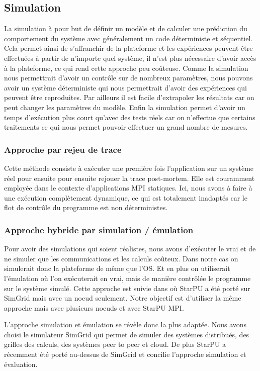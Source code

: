 \documentclass[smallextended]{svjour3}
\begin{document}
\subsection{Simulation}
\label{sec-2-2}
La simulation à pour but de définir un modèle et de calculer une
prédiction du comportement du système avec généralement un code
déterministe et séquentiel. Cela permet ainsi de s'affranchir de la
plateforme et les expériences peuvent être effectuées à partir de
n'importe quel système, il n'est plus nécessaire d'avoir accès à la
plateforme, ce qui rend cette approche peu coûteuse. Comme la 
simulation nous permettrait d'avoir un contrôle sur de nombreux
paramètres, nous pouvons avoir un système déterministe qui 
nous permettrait d'avoir des expériences qui peuvent être reproduites. 
Par ailleurs il est facile d'extrapoler les résultats car on peut
changer les paramètres du modèle. Enfin la simulation
permet d'avoir un temps d'exécution plus court qu'avec des tests
réels car on n'effectue que certains traitements ce qui nous permet
pouvoir effectuer un grand nombre de mesures.  
\subsubsection{Approche par rejeu de trace}
\label{sec-2-2-1}
Cette méthode consiste à exécuter une première fois l'application
sur un système réel pour ensuite pour ensuite rejouer la trace
post-mortem. Elle est couramment employée dans le contexte 
d'applications MPI statiques. Ici, nous avons à faire à une
exécution complètement dynamique, ce qui est totalement inadaptés car
le flot de contrôle du programme est non déterministes. 
\subsubsection{Approche hybride par simulation / émulation}
\label{sec-2-2-2}
Pour avoir des simulations qui soient réalistes, nous avons
d'exécuter le vrai et de ne simuler que les communications et les
calculs coûteux. Dans notre cas on simulerait donc la plateforme de
même que l'OS. Et en plus on utiliserait l'émulation où l'on
exécuterait en vrai, mais de manière contrôlée le programme sur le
système simulé. Cette approche est suivie dans \cite{StarPUSG} où
StarPU a été porté sur SimGrid mais avec un noeud seulement. Notre
objectif est d'utiliser la même approche mais avec plusieurs
noeuds et avec StarPU MPI. 

L'approche simulation et émulation se révèle donc la plus adaptée.
Nous avons choisi le simulateur SimGrid qui permet de simuler des
systèmes distribués, des grilles des calculs, des systèmes peer to
peer et cloud. De plus StarPU a récemment été porté au-dessus de
SimGrid et concilie l'approche simulation et évaluation.
\end{document}
